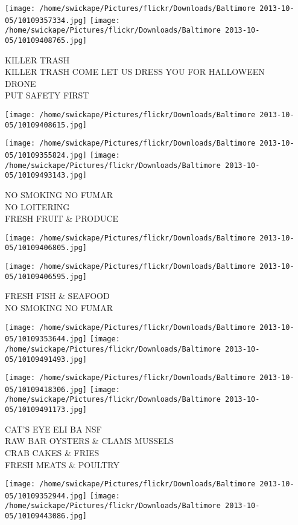\documentclass[10pt,letterpaper]{article}
\begin{document}
\texttt{[image: /home/swickape/Pictures/flickr/Downloads/Baltimore 2013-10-05/10109357334.jpg]}
\texttt{[image: /home/swickape/Pictures/flickr/Downloads/Baltimore 2013-10-05/10109408765.jpg]}

KILLER TRASH\\
KILLER TRASH COME LET US DRESS YOU FOR HALLOWEEN\\
DRONE\\
PUT SAFETY FIRST
\pagebreak

\texttt{[image: /home/swickape/Pictures/flickr/Downloads/Baltimore 2013-10-05/10109408615.jpg]}

\vspace{0.25in}
\texttt{[image: /home/swickape/Pictures/flickr/Downloads/Baltimore 2013-10-05/10109355824.jpg]}
\texttt{[image: /home/swickape/Pictures/flickr/Downloads/Baltimore 2013-10-05/10109493143.jpg]}

NO SMOKING NO FUMAR\\
NO LOITERING\\
FRESH FRUIT \& PRODUCE
\pagebreak

\texttt{[image: /home/swickape/Pictures/flickr/Downloads/Baltimore 2013-10-05/10109406805.jpg]}

\vspace{0.25in}
\texttt{[image: /home/swickape/Pictures/flickr/Downloads/Baltimore 2013-10-05/10109406595.jpg]}

FRESH FISH \& SEAFOOD\\
NO SMOKING NO FUMAR
\pagebreak

\texttt{[image: /home/swickape/Pictures/flickr/Downloads/Baltimore 2013-10-05/10109353644.jpg]}
\texttt{[image: /home/swickape/Pictures/flickr/Downloads/Baltimore 2013-10-05/10109491493.jpg]}

\texttt{[image: /home/swickape/Pictures/flickr/Downloads/Baltimore 2013-10-05/10109418306.jpg]}
\texttt{[image: /home/swickape/Pictures/flickr/Downloads/Baltimore 2013-10-05/10109491173.jpg]}

CAT'S EYE ELI BA NSF\\
RAW BAR OYSTERS \& CLAMS MUSSELS\\
CRAB CAKES \& FRIES\\
FRESH MEATS \& POULTRY
\pagebreak

\texttt{[image: /home/swickape/Pictures/flickr/Downloads/Baltimore 2013-10-05/10109352944.jpg]}
\texttt{[image: /home/swickape/Pictures/flickr/Downloads/Baltimore 2013-10-05/10109443086.jpg]}
\end{document}
